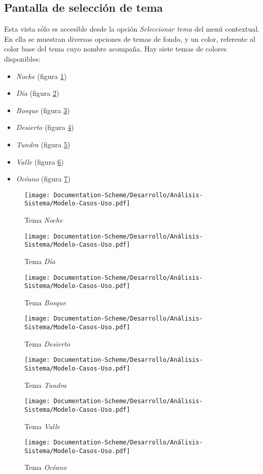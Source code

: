 \subsection{Pantalla de selección de tema}
Esta vista sólo es accesible desde la opción \textit{Seleccionar tema} del menú contextual.
En ella se muestran diversas opciones de temas de fondo, y un color, referente al color base del tema cuyo nombre acompaña.
Hay siete temas de colores disponibles: 
\begin{itemize}
    \item \textit{Noche} (figura \ref*{Noche})
    \item \textit{Día} (figura \ref*{Dia})
    \item \textit{Bosque} (figura \ref*{Bosque})
    \item \textit{Desierto} (figura \ref*{Desierto})
    \item \textit{Tundra} (figura \ref*{Tundra})
    \item \textit{Valle} (figura \ref*{Valle})
    \item \textit{Océano} (figura \ref*{Oceano})
\end{itemize}

\begin{figure}[H]
    \centering
    \texttt{[image: Documentation-Scheme/Desarrollo/Análisis-Sistema/Modelo-Casos-Uso.pdf]}
    \caption{Tema \textit{Noche}}
    \label{Noche}    
\end{figure}
\begin{figure}[H]
    \centering
    \texttt{[image: Documentation-Scheme/Desarrollo/Análisis-Sistema/Modelo-Casos-Uso.pdf]}
    \caption{Tema \textit{Día}}
    \label{Dia}    
\end{figure}
\begin{figure}[H]
    \centering
    \texttt{[image: Documentation-Scheme/Desarrollo/Análisis-Sistema/Modelo-Casos-Uso.pdf]}
    \caption{Tema \textit{Bosque}}
    \label{Bosque}    
\end{figure}
\begin{figure}[H]
    \centering
    \texttt{[image: Documentation-Scheme/Desarrollo/Análisis-Sistema/Modelo-Casos-Uso.pdf]}
    \caption{Tema \textit{Desierto}}
    \label{Desierto}    
\end{figure}
\begin{figure}[H]
    \centering
    \texttt{[image: Documentation-Scheme/Desarrollo/Análisis-Sistema/Modelo-Casos-Uso.pdf]}
    \caption{Tema \textit{Tundra}}
    \label{Tundra}    
\end{figure}
\begin{figure}[H]
    \centering
    \texttt{[image: Documentation-Scheme/Desarrollo/Análisis-Sistema/Modelo-Casos-Uso.pdf]}
    \caption{Tema \textit{Valle}}
    \label{Valle}    
\end{figure}
\begin{figure}[H]
    \centering
    \texttt{[image: Documentation-Scheme/Desarrollo/Análisis-Sistema/Modelo-Casos-Uso.pdf]}
    \caption{Tema \textit{Océano}}
    \label{Oceano}    
\end{figure}


